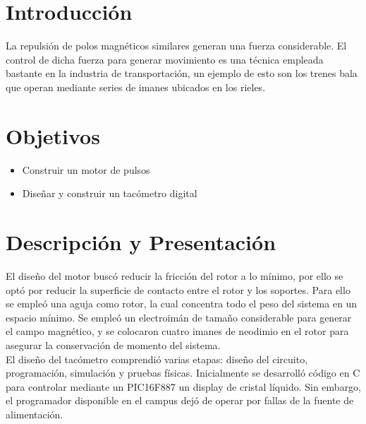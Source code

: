 \section{Introducci\'on}
La repulsi\'on de polos magn\'eticos similares generan una fuerza considerable. El control de dicha fuerza para generar movimiento es
una t\'ecnica empleada bastante en la industria de transportaci\'on, un ejemplo de esto son los trenes bala que operan mediante series
 de imanes ubicados en los rieles.

\section{Objetivos}
\begin{itemize}
 \item Construir un motor de pulsos
 \item Dise\~nar y construir un tac\'ometro digital
\end{itemize}

\section{Descripci\'on y Presentaci\'on}
El dise\~no del motor busc\'o reducir la fricci\'on del rotor a lo m\'inimo, por ello se opt\'o por reducir la superficie de contacto
entre el rotor y los soportes. Para ello se emple\'o una aguja como rotor, la cual concentra todo el peso del sistema en un
espacio m\'inimo. Se emple\'o un electroim\'an de tama\~no considerable para generar el campo magn\'etico, y se colocaron
cuatro imanes de neodimio en el rotor para asegurar la conservaci\'on de momento del sistema.\\

El dise\~no del tac\'ometro comprendi\'o varias etapas: dise\~no del circuito, programaci\'on, simulaci\'on y pruebas f\'isicas.
Inicialmente se desarroll\'o c\'odigo en C para controlar mediante un PIC16F887 un  display de cristal l\'iquido. Sin embargo,
el programador disponible en el campus dej\'o de operar por fallas de la fuente de alimentaci\'on.